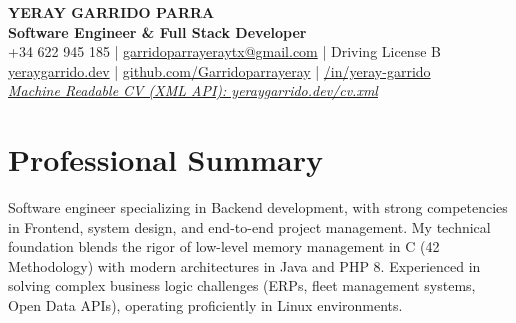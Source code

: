 \documentclass[a4paper,10pt]{article}
\begin{document}
\begin{center}
    {\huge \textbf{YERAY GARRIDO PARRA}} \\ \vspace{4pt}
    {\large \textbf{Software Engineer \& Full Stack Developer}} \\ \vspace{6pt}
    \small
    \faPhone*\hspace{0.5em} +34 622 945 185 \hspace{0.5em} | \hspace{0.5em}
    \faEnvelope \hspace{0.5em} \href{mailto:garridoparrayeraytx@gmail.com}{garridoparrayeraytx@gmail.com} \hspace{0.5em} | \hspace{0.5em}
    \faCar \hspace{0.5em} Driving License B \\ \vspace{3pt}
    \faGlobe \hspace{0.5em} \href{https://yeraygarrido.dev}{yeraygarrido.dev} \hspace{0.5em} | \hspace{0.5em}
    \faGithub \hspace{0.5em} \href{https://github.com/Garridoparrayeray}{github.com/Garridoparrayeray} \hspace{0.5em} | \hspace{0.5em}
    \faLinkedin\href{https://www.linkedin.com/in/yeray-garrido}{/in/yeray-garrido} \\ \vspace{3pt}
    \faCode \textit{ \href{https://yeraygarrido.dev/cv.xml}{Machine Readable CV (XML API): yeraygarrido.dev/cv.xml}}
\end{center}

\vspace{4pt}

\section{Professional Summary}
Software engineer specializing in Backend development, with strong competencies in Frontend, system design, and end-to-end project management. My technical foundation blends the rigor of low-level memory management in C (42 Methodology) with modern architectures in Java and PHP 8. Experienced in solving complex business logic challenges (ERPs, fleet management systems, Open Data APIs), operating proficiently in Linux environments.
\end{document}
